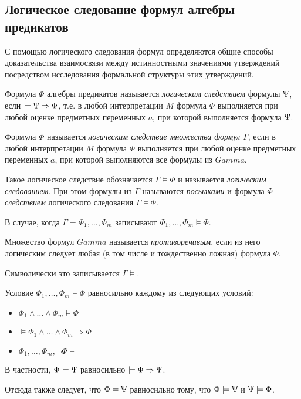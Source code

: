 \subsection*{Логическое следование формул алгебры предикатов}
С помощью логического следования формул 
определяются общие способы доказательства 
взаимосвязи между истинностными значениями 
утверждений посредством исследования 
формальной структуры этих утверждений.

\begin{definition}
    Формула $\Phi$ алгебры предикатов называется \textit{логическим следствием} формулы $\Uppsi$, если $\models\Uppsi\Rightarrow\Phi$, т.е. в любой интерпретации $M$ формула $\Phi$ выполняется при любой оценке предметных переменных $a$, при которой выполняется формула $\Uppsi$.
\end{definition}

\begin{definition}
    Формула $\Phi$ называется \textit{логическим следствие множества формул $\Gamma $}, если в любой интерпретации $M$ формула $\Phi $ выполняется при любой оценке предметных переменных $a$, при которой выполняются все формулы из $Gamma$.

    Такое логическое следствие обозначается $\Gamma\models\Phi$ и называется \textit{логическим следованием}. При этом формулы из $\Gamma $ называются \textit{посылками} и формула $\Phi$ -- \textit{следствием} логического следования $\Gamma\models\Phi$.

    В случае, когда $\Gamma = {\Phi_1,\ldots,\Phi_m}$ записывают $\Phi_1,\ldots,\Phi_m\models\Phi$.
\end{definition}

\begin{definition}
    Множество формул $Gamma$ называется \textit{противоречивым}, если из него логическим следует любая (в том числе и тождественно ложная) формула $\Phi$. 

    Символически это записывается $\Gamma\models$.
\end{definition}

\begin{lemma}
    Условие $\Phi_1,\ldots,\Phi_m\models\Phi$ равносильно каждому из следующих условий:
    \begin{itemize}
        \item $\Phi_1\land\ldots\land\Phi_m\models\Phi$
        \item $\models\Phi_1\land\ldots\land\Phi_m\Rightarrow\Phi$
        \item $\Phi_1,\ldots,\Phi_m,\lnot\Phi\models$
    \end{itemize}
    В частности, $\Phi\models\Uppsi$ равносильно $\models\Phi\Rightarrow\Uppsi$. 

    Отсюда также следует, что $\Phi=\Uppsi$ равносильно тому, что $\Phi\models\Uppsi$ и $\Uppsi\models\Phi$.
\end{lemma}

